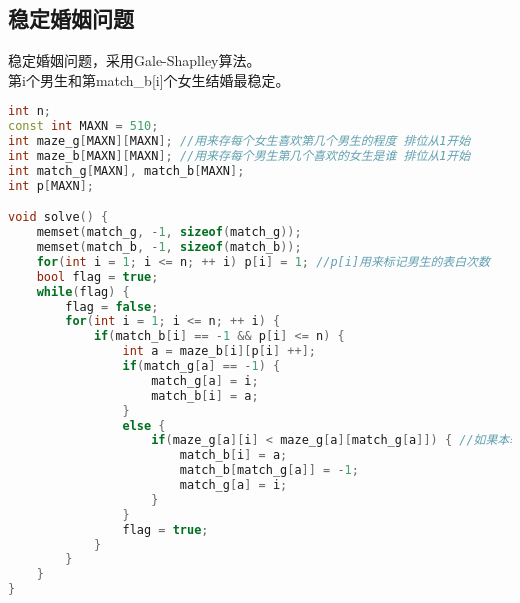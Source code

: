 \subsection{稳定婚姻问题}
稳定婚姻问题，采用Gale-Shaplley算法。\\
第i个男生和第match\_b[i]个女生结婚最稳定。
    \begin{lstlisting}[language=c++]
int n;
const int MAXN = 510;
int maze_g[MAXN][MAXN]; //用来存每个女生喜欢第几个男生的程度 排位从1开始
int maze_b[MAXN][MAXN]; //用来存每个男生第几个喜欢的女生是谁 排位从1开始
int match_g[MAXN], match_b[MAXN];
int p[MAXN];

void solve() {
    memset(match_g, -1, sizeof(match_g));
    memset(match_b, -1, sizeof(match_b));
    for(int i = 1; i <= n; ++ i) p[i] = 1; //p[i]用来标记男生的表白次数
    bool flag = true;
    while(flag) {
        flag = false;
        for(int i = 1; i <= n; ++ i) {
            if(match_b[i] == -1 && p[i] <= n) {
                int a = maze_b[i][p[i] ++];
                if(match_g[a] == -1) {
                    match_g[a] = i;
                    match_b[i] = a;
                }
                else {
                    if(maze_g[a][i] < maze_g[a][match_g[a]]) { //如果本轮男生更优秀则选择本轮男生
                        match_b[i] = a;
                        match_b[match_g[a]] = -1;
                        match_g[a] = i;
                    }
                }
                flag = true;
            }
        }
    }
}
    \end{lstlisting}
